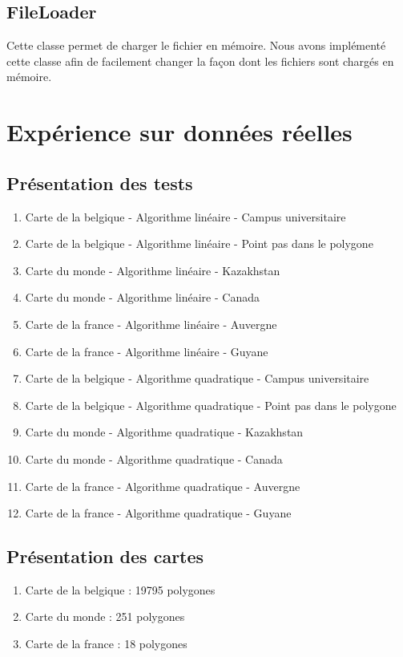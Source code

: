 \documentclass[utf8]{article}
\begin{document}
\begin{large}
\subsection{FileLoader}
\par
\indent
Cette classe permet de charger le fichier en mémoire. Nous avons implémenté
cette classe afin de facilement changer la façon dont les fichiers sont chargés
en mémoire.

\section{Expérience sur données réelles}
\subsection{Présentation des tests}
\begin{enumerate}
    \item Carte de la belgique - Algorithme linéaire - Campus universitaire
    \item Carte de la belgique - Algorithme linéaire - Point pas dans le polygone
    \item Carte du monde - Algorithme linéaire - Kazakhstan
    \item Carte du monde - Algorithme linéaire - Canada
    \item Carte de la france - Algorithme linéaire - Auvergne
    \item Carte de la france - Algorithme linéaire - Guyane
    \item Carte de la belgique - Algorithme quadratique - Campus universitaire
    \item Carte de la belgique - Algorithme quadratique - Point pas dans le polygone
    \item Carte du monde - Algorithme quadratique - Kazakhstan
    \item Carte du monde - Algorithme quadratique - Canada
    \item Carte de la france - Algorithme quadratique - Auvergne
    \item Carte de la france - Algorithme quadratique - Guyane
  \end{enumerate}

  \subsection{Présentation des cartes}
  \begin{enumerate}
      \item Carte de la belgique : 19795 polygones
      \item Carte du monde : 251 polygones
      \item Carte de la france : 18 polygones
    \end{enumerate}



\end{large}
\end{document}
